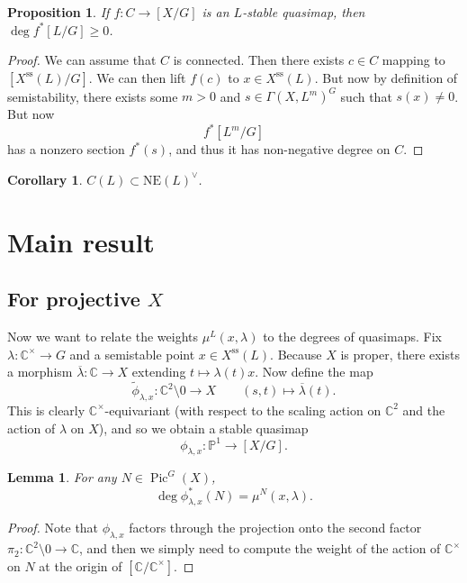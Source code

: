 \documentclass{amsart}
\newtheorem{cor}[thm]{Corollary}
\newtheorem{prop}[thm]{Proposition}
\newtheorem{lem}[thm]{Lemma}
\theoremstyle{definition}
\theoremstyle{remark}
\theoremstyle{plain}
\theoremstyle{definition}
\theoremstyle{remark}
\newcommand{\C}{\mathbb{C}}
\renewcommand{\P}{\mathbb{P}}
\newcommand{\mr}[1]{\mathrm{#1}}
\newcommand{\ol}[1]{\overline{#1}}
\newcommand{\wt}[1]{\widetilde{#1}}
\newcommand{\1}{\mathbf{1}}
\newcommand{\2}{\mathbf{2}}
\newcommand{\3}{\mathbf{3}}
\DeclareMathOperator{\Pic}{Pic}
\begin{document}
\begin{prop}
    If $f \colon C \to [X/G]$ is an $L$-stable quasimap, then $\deg f^* [L/G] \geq 0$.
\end{prop}

\begin{proof}
    We can assume that $C$ is connected. Then there exists $c \in C$ mapping to $[X^{\mr{ss}}(L)/G]$. We can then lift $f(c)$ to $x \in X^{\mr{ss}}(L)$. But now by definition of semistability, there exists some $m > 0$ and $s \in \Gamma(X, L^m)^G$ such that $s(x) \neq 0$. But now 
    \[ f^* [L^m/G] \]
    has a nonzero section $f^*(s)$, and thus it has non-negative degree on $C$.
\end{proof}

\begin{cor}
    $C(L) \subset \mr{NE}(L)^{\vee}$.
\end{cor}


\section{Main result}

\subsection{For projective $X$}

Now we want to relate the weights $\mu^L(x, \lambda)$ to the degrees of quasimaps. Fix $\lambda \colon \C^{\times} \to G$ and a semistable point $x \in X^{\mr{ss}}(L)$. Because $X$ is proper, there exists a morphism $\ol{\lambda} \colon \C \to X$ extending $t \mapsto \lambda(t) x$. Now define the map
\[ \wt{\phi}_{\lambda, x} \colon \C^2 \setminus \qty{0} \to X \qquad (s,t) \mapsto \ol{\lambda}(t). \]
This is clearly $\C^{\times}$-equivariant (with respect to the scaling action on $\C^2$ and the action of $\lambda$ on $X$), and so we obtain a stable quasimap
\[ \phi_{\lambda, x} \colon \P^1 \to [X/G]. \]

\begin{lem}
    For any $N \in \Pic^G(X)$, 
    \[ \deg \phi^*_{\lambda, x}(N) = \mu^N(x, \lambda). \]
\end{lem}

\begin{proof}
    Note that $\phi_{\lambda, x}$ factors through the projection onto the second factor $\pi_2 \colon \C^2 \setminus 0 \to \C$, and then we simply need to compute the weight of the action of $\C^{\times}$ on $N$ at the origin of $[\C / \C^{\times}]$.
\end{proof}
\end{document}
